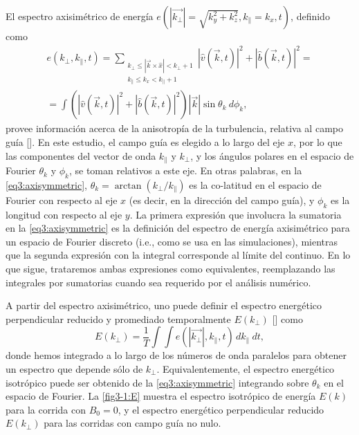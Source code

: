 El espectro axisimétrico de energía $e(|\vec{k_\perp}| =
\sqrt{k_y^2+k_z^2}, k_\parallel = k_x, t)$, definido como
\begin{equation}\label{eq3:axisymmetric}
\begin{split}  e(k_\perp, k_\parallel, t) = \sum_{\substack{k_\perp \leq |\vec{k}\times\hat{x}| < k_\perp+1 \\ k_\parallel \leq k_x < k_\parallel +1}} |\hat{v}(\vec{k},t)|^2 +|\hat{b}(\vec{k},t)|^2 = \\ = \int \left(|\hat{v}(\vec{k},t)|^2 +|\hat{b}(\vec{k},t)|^2\right) |\vec{k}| \sin \theta_k~d\phi_k,
\end{split}
\end{equation}
provee información acerca de la anisotropía de la turbulencia,
relativa al campo guía [\cite{mininni_isotropization_2012}]. En este
estudio, el campo guía es elegido a lo largo del eje $x$, por lo que
las componentes del vector de onda $k_\parallel$ y $k_\perp$, y los
ángulos polares en el espacio de Fourier $\theta_k$ y $\phi_k$, se
toman relativos a este eje. En otras palabras, en
la \cref{eq3:axisymmetric}, $\theta_k = \arctan(k_\perp/k_\parallel)$
es la co-latitud en el espacio de Fourier con respecto al eje $x$ (es
decir, en la dirección del campo guía), y $\phi_k$ es la longitud con
respecto al eje $y$. La primera expresión que involucra la sumatoria
en la \cref{eq3:axisymmetric} es la definición del espectro de energía
axisimétrico para un espacio de Fourier discreto (i.e., como se usa en
las simulaciones), mientras que la segunda expresión con la integral
corresponde al límite del continuo. En lo que sigue, trataremos ambas
expresiones como equivalentes, reemplazando las integrales por
sumatorias cuando sea requerido por el análisis numérico.

A partir del espectro axisimétrico, uno puede definir el espectro
energético perpendicular reducido y promediado temporalmente
$E(k_\perp)$ [\cite{mininni_isotropization_2012}] como
\begin{equation}\label{eq3:reducedspectrum}
  E\left(k_\perp\right) = \frac{1}{T}\int\int e(|\vec{k_\perp}|,
  k_\parallel, t) \, dk_\parallel~dt,
\end{equation}
donde hemos integrado a lo largo de los números de onda paralelos para
obtener un espectro que depende sólo de $k_\perp$. Equivalentemente, el
espectro energético isotrópico puede ser obtenido de la
\cref{eq3:axisymmetric} integrando sobre $\theta_k$ en el espacio de
Fourier. La \cref{fig3-1:E} muestra el espectro isotrópico de energía
$E(k)$ para la corrida con $B_0=0$, y el espectro energético
perpendicular reducido $E(k_\perp)$ para las corridas con campo guía
no nulo.

